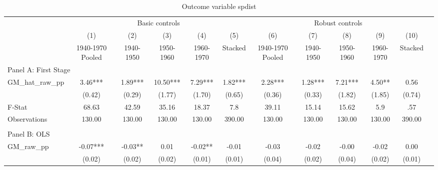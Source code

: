  \begin{table}[htbp]\centering {} \begin{threeparttable} \caption{Outcome variable spdist } \begin{tabular}{l*{11}{c}} \toprule
          &\multicolumn{5}{c}{Basic controls}                                   &\multicolumn{5}{c}{Robust controls}                                  \\\cmidrule(lr){2-6}\cmidrule(lr){7-11}
          &\multicolumn{1}{c}{(1)}&\multicolumn{1}{c}{(2)}&\multicolumn{1}{c}{(3)}&\multicolumn{1}{c}{(4)}&\multicolumn{1}{c}{(5)}&\multicolumn{1}{c}{(6)}&\multicolumn{1}{c}{(7)}&\multicolumn{1}{c}{(8)}&\multicolumn{1}{c}{(9)}&\multicolumn{1}{c}{(10)}\\
          &\multicolumn{1}{c}{1940-1970 Pooled}&\multicolumn{1}{c}{1940-1950}&\multicolumn{1}{c}{1950-1960}&\multicolumn{1}{c}{1960-1970}&\multicolumn{1}{c}{Stacked}&\multicolumn{1}{c}{1940-1970 Pooled}&\multicolumn{1}{c}{1940-1950}&\multicolumn{1}{c}{1950-1960}&\multicolumn{1}{c}{1960-1970}&\multicolumn{1}{c}{Stacked}\\
\cmidrule(lr){1-11}
\multicolumn{10}{l}{Panel A: First Stage}\\
\cmidrule(lr){1-11}
GM\_hat\_raw\_pp&      3.46***&      1.89***&     10.50***&      7.29***&      1.82***&      2.28***&      1.28***&      7.21***&      4.50** &      0.56   \\
          &    (0.42)   &    (0.29)   &    (1.77)   &    (1.70)   &    (0.65)   &    (0.36)   &    (0.33)   &    (1.82)   &    (1.85)   &    (0.74)   \\
\midrule
F-Stat    &     68.63   &     42.59   &     35.16   &     18.37   &       7.8   &     39.11   &     15.14   &     15.62   &       5.9   &       .57   \\
Observations&    130.00   &    130.00   &    130.00   &    130.00   &    390.00   &    130.00   &    130.00   &    130.00   &    130.00   &    390.00   \\
\cmidrule[\heavyrulewidth](lr){1-11} \\ \cmidrule[\heavyrulewidth](lr){1-11}
\multicolumn{10}{l}{Panel B: OLS}\\
\cmidrule(lr){1-11}
GM\_raw\_pp &     -0.07***&     -0.03** &      0.01   &     -0.02** &     -0.01   &     -0.03   &     -0.02   &     -0.00   &     -0.02   &      0.00   \\
          &    (0.02)   &    (0.02)   &    (0.02)   &    (0.01)   &    (0.01)   &    (0.04)   &    (0.02)   &    (0.04)   &    (0.02)   &    (0.01)   \\

\end{tabular}
\end{threeparttable}
\end{table}

